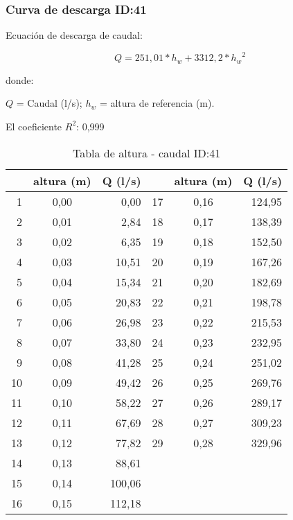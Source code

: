 \documentclass[]{article}
\begin{document}
\clearpage

\subsubsection{Curva de descarga ID:41}\label{ID:41}

Ecuación de descarga de caudal:

\[Q = 251,01* h_w + 3312,2*{{h_w}^2}\]

donde:

\(Q\) = Caudal (l/s); \(h_w\) = altura de referencia (m).

El coeficiente \(R^2\): 0,999


\begin{table}[H]

\caption{Tabla de altura - caudal ID:41}
\centering

\begin{center}
\begingroup\fontsize{10pt}{11pt}\selectfont
\begin{tabular}{rcrrcr}
  \hline
 & altura (m) & Q (l/s) &  & altura (m) & Q (l/s) \\ 
  \hline
  1 & 0,00 & 0,00 &  17 & 0,16 & 124,95 \\ 
    2 & 0,01 & 2,84 &  18 & 0,17 & 138,39 \\ 
    3 & 0,02 & 6,35 &  19 & 0,18 & 152,50 \\ 
    4 & 0,03 & 10,51 &  20 & 0,19 & 167,26 \\ 
    5 & 0,04 & 15,34 &  21 & 0,20 & 182,69 \\ 
    6 & 0,05 & 20,83 &  22 & 0,21 & 198,78 \\ 
    7 & 0,06 & 26,98 &  23 & 0,22 & 215,53 \\ 
    8 & 0,07 & 33,80 &  24 & 0,23 & 232,95 \\ 
    9 & 0,08 & 41,28 &  25 & 0,24 & 251,02 \\ 
   10 & 0,09 & 49,42 &  26 & 0,25 & 269,76 \\ 
   11 & 0,10 & 58,22 &  27 & 0,26 & 289,17 \\ 
   12 & 0,11 & 67,69 &  28 & 0,27 & 309,23 \\ 
   13 & 0,12 & 77,82 &  29 & 0,28 & 329,96 \\ 
   14 & 0,13 & 88,61 &  &  &  \\ 
   15 & 0,14 & 100,06 &  &  &  \\ 
   16 & 0,15 & 112,18 &  &  &  \\ 
   \hline
\end{tabular}
\endgroup\end{center}
\end{table}
\end{document}
